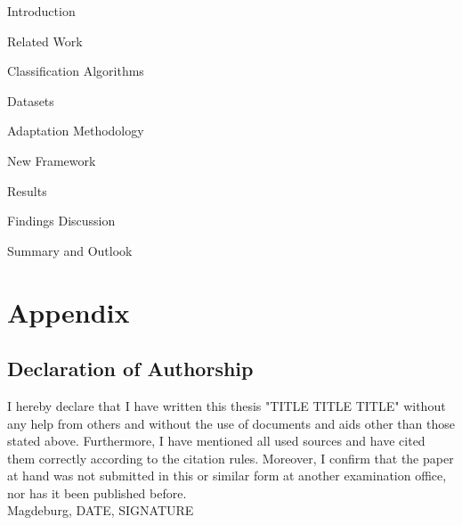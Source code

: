 \renewcommand*\contentsname{Table of Contents}
\tableofcontents
\thispagestyle{empty}
 
 \null\newpage
{} 






\thispagestyle{empty}
\null\newpage
{}
{Introduction}
\null\newpage

{Related Work}
\null\newpage

{Classification Algorithms}
\null\newpage

{Datasets}
\null\newpage

{Adaptation Methodology}
\null\newpage

{New Framework}
\null\newpage

{Results}
\null\newpage

{Findings Discussion}
\null\newpage

{Summary and Outlook}

\chapter*{Appendix}

\null\newpage

% 
\printbibliography
\newpage

\section{Declaration of Authorship}
I hereby declare that I have written this thesis "TITLE TITLE TITLE"
without any help from others and without the use of documents and aids
other than those stated above. Furthermore, I have mentioned all used
sources and have cited them correctly according to the citation rules.
Moreover, I confirm that the paper at hand was not submitted in this or
similar form at another examination office, nor has it been published
before.
\\
Magdeburg, DATE, SIGNATURE